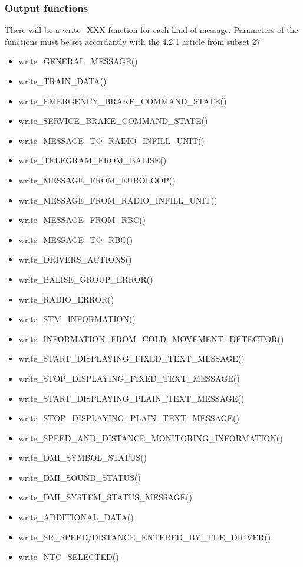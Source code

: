 \documentclass{template/openetcs_article}
\begin{document}
		\subsubsection{Output functions}
			There will be a write\_XXX function for each kind of message. Parameters of the functions must be set accordantly with the 4.2.1 article from subset 27 
			\begin{itemize}
				\item write\_GENERAL\_MESSAGE()
				\item write\_TRAIN\_DATA()
				\item write\_EMERGENCY\_BRAKE\_COMMAND\_STATE()
				\item write\_SERVICE\_BRAKE\_COMMAND\_STATE()
				\item write\_MESSAGE\_TO\_RADIO\_INFILL\_UNIT()
				\item write\_TELEGRAM\_FROM\_BALISE()
				\item write\_MESSAGE\_FROM\_EUROLOOP()
				\item write\_MESSAGE\_FROM\_RADIO\_INFILL\_UNIT()
				\item write\_MESSAGE\_FROM\_RBC()
				\item write\_MESSAGE\_TO\_RBC()
				\item write\_DRIVERS\_ACTIONS()
				\item write\_BALISE\_GROUP\_ERROR()
				\item write\_RADIO\_ERROR()
				\item write\_STM\_INFORMATION()
				\item write\_INFORMATION\_FROM\_COLD\_MOVEMENT\_DETECTOR()
				\item write\_START\_DISPLAYING\_FIXED\_TEXT\_MESSAGE()
				\item write\_STOP\_DISPLAYING\_FIXED\_TEXT\_MESSAGE()
				\item write\_START\_DISPLAYING\_PLAIN\_TEXT\_MESSAGE()
				\item write\_STOP\_DISPLAYING\_PLAIN\_TEXT\_MESSAGE()
				\item write\_SPEED\_AND\_DISTANCE\_MONITORING\_INFORMATION()
				\item write\_DMI\_SYMBOL\_STATUS()
				\item write\_DMI\_SOUND\_STATUS()
				\item write\_DMI\_SYSTEM\_STATUS\_MESSAGE()
				\item write\_ADDITIONAL\_DATA()
				\item write\_SR\_SPEED/DISTANCE\_ENTERED\_BY\_THE\_DRIVER()
				\item write\_NTC\_SELECTED()

\end{itemize}
\end{document}
